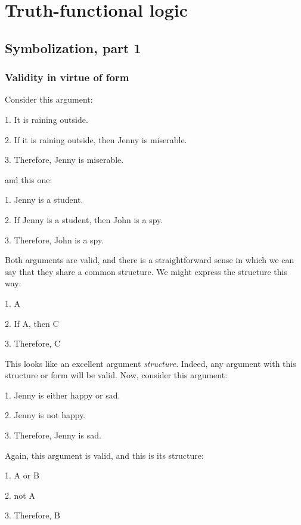 \part{Truth-functional logic}
\label{ch.TFL}

\chapter{Symbolization, part 1}

\section{Validity in virtue of form}\label{s:ValidityInVirtueOfForm}
Consider this argument:
	\begin{earg}
		\item[1.] It is raining outside.
		\item[2.] If it is raining outside, then Jenny is miserable.
		\item[3.] Therefore, Jenny is miserable.
	\end{earg}
and this one:
	\begin{earg}
		\item[1.] Jenny is a student.
		\item[2.] If Jenny is a student, then John is a spy.
		\item[3.] Therefore, John is a spy.
	\end{earg}
Both arguments are valid, and there is a straightforward sense in which we can say that they share a common structure. We might express the structure this way:
	\begin{earg}
		\item[1.] A
		\item[2.] If A, then C
		\item[3.] Therefore, C
	\end{earg}
This looks like an excellent argument \emph{structure}. Indeed, any argument with this structure or form will be valid. Now, consider this argument:
	\begin{earg}
		\item[1.] Jenny is either happy or sad.
		\item[2.] Jenny is not happy.
		\item[3.] Therefore, Jenny is sad.
	\end{earg}
Again, this argument is valid, and this is its structure:
	\begin{earg}
		\item[1.] A or B
		\item[2.] not A
		\item[3.] Therefore, B
	\end{earg}

